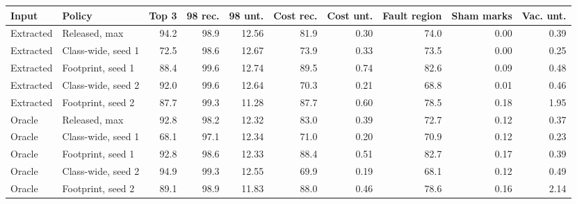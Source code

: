 \begin{tabular}{llrrrrrrrr}
\toprule
Input & Policy & Top 3 & 98 rec. & 98 unt. & Cost rec. & Cost unt. & Fault region & Sham marks & Vac. unt. \\
\midrule
Extracted & Released, max & 94.2 & 98.9 & 12.56 & 81.9 & 0.30 & 74.0 & 0.00 & 0.39 \\
Extracted & Class-wide, seed 1 & 72.5 & 98.6 & 12.67 & 73.9 & 0.33 & 73.5 & 0.00 & 0.25 \\
Extracted & Footprint, seed 1 & 88.4 & 99.6 & 12.74 & 89.5 & 0.74 & 82.6 & 0.09 & 0.48 \\
Extracted & Class-wide, seed 2 & 92.0 & 99.6 & 12.64 & 70.3 & 0.21 & 68.8 & 0.01 & 0.46 \\
Extracted & Footprint, seed 2 & 87.7 & 99.3 & 11.28 & 87.7 & 0.60 & 78.5 & 0.18 & 1.95 \\
\midrule
Oracle & Released, max & 92.8 & 98.2 & 12.32 & 83.0 & 0.39 & 72.7 & 0.12 & 0.37 \\
Oracle & Class-wide, seed 1 & 68.1 & 97.1 & 12.34 & 71.0 & 0.20 & 70.9 & 0.12 & 0.23 \\
Oracle & Footprint, seed 1 & 92.8 & 98.6 & 12.33 & 88.4 & 0.51 & 82.7 & 0.17 & 0.39 \\
Oracle & Class-wide, seed 2 & 94.9 & 99.3 & 12.55 & 69.9 & 0.19 & 68.1 & 0.12 & 0.49 \\
Oracle & Footprint, seed 2 & 89.1 & 98.9 & 11.83 & 88.0 & 0.46 & 78.6 & 0.16 & 2.14 \\
\bottomrule
\end{tabular}
